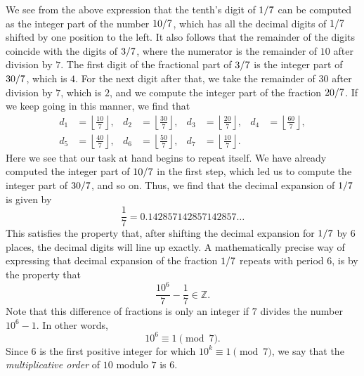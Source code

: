 We see from the above expression that the tenth's digit of $1/7$ can be computed as the integer part of the number $10/7$, which has all the decimal digits of $1/7$ shifted by one position to the left. It also follows that the remainder of the digits coincide with the digits of $3/7$, where the numerator is the remainder of $10$ after division by $7$. The first digit of the fractional part of $3/7$ is the integer part of $30/7$, which is $4$. For the next digit after that, we take the remainder of $30$ after division by $7$, which is $2$, and we compute the integer part of the fraction $20/7$. If we keep going in this manner, we find that
\begin{align*}
  d_1 & =\left\lfloor\frac{10}{7}\right\rfloor, &
  d_2 & =\left\lfloor\frac{30}{7}\right\rfloor, &
  d_3 & =\left\lfloor\frac{20}{7}\right\rfloor, &
  d_4 & =\left\lfloor\frac{60}{7}\right\rfloor, \\
  d_5 & =\left\lfloor\frac{40}{7}\right\rfloor, &
  d_6 & =\left\lfloor\frac{50}{7}\right\rfloor, &
  d_7 & =\left\lfloor\frac{10}{7}\right\rfloor.
\end{align*}
Here we see that our task at hand begins to repeat itself. We have already computed the integer part of $10/7$ in the first step, which led us to compute the integer part of $30/7$, and so on. Thus, we find that the decimal expansion of $1/7$ is given by
\begin{equation*}
  \frac{1}{7}=0.142857142857142857\ldots
\end{equation*}
This satisfies the property that, after shifting the decimal expansion for $1/7$ by $6$ places, the decimal digits will line up exactly. A mathematically precise way of expressing that decimal expansion of the fraction $1/7$ repeats with period $6$, is by the property that
\begin{equation*}
  \frac{10^6}{7}-\frac{1}{7}\in\mathbb{Z}.
\end{equation*}
Note that this difference of fractions is only an integer if $7$ divides the number $10^6-1$. In other words,
\begin{equation*}
  10^6\equiv 1\pmod{7}.
\end{equation*}
Since $6$ is the first positive integer for which $10^k\equiv 1\pmod{7}$, we say that the \emph{multiplicative order} of $10$ modulo $7$ is $6$.


